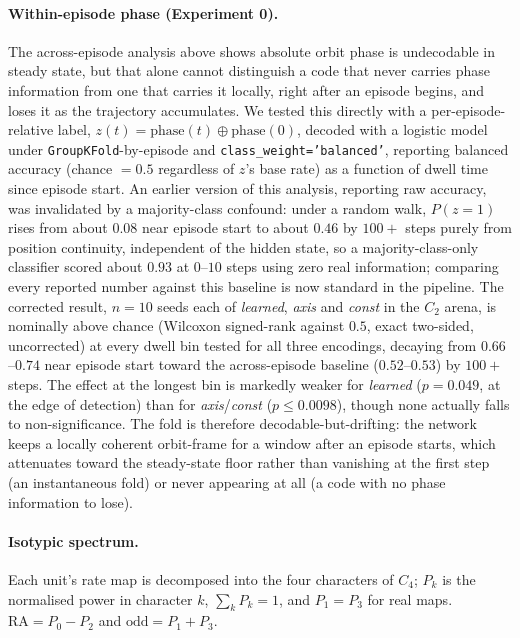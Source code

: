 \documentclass[9pt,lineno]{elife}
\begin{document}
\paragraph{Within-episode phase (Experiment 0).} The across-episode analysis above shows absolute
orbit phase is undecodable in steady state, but that alone cannot distinguish a code that never
carries phase information from one that carries it locally, right after an episode begins, and
loses it as the trajectory accumulates. We tested this directly with a per-episode-relative label,
$z(t) = \text{phase}(t) \oplus \text{phase}(0)$, decoded with a logistic model under
\texttt{GroupKFold}-by-episode and \texttt{class\_weight='balanced'}, reporting balanced accuracy
(chance $=0.5$ regardless of $z$'s base rate) as a function of dwell time since episode start. An
earlier version of this analysis, reporting raw accuracy, was invalidated by a majority-class
confound: under a random walk, $P(z=1)$ rises from about $0.08$ near episode start to about $0.46$
by $100+$ steps purely from position continuity, independent of the hidden state, so a
majority-class-only classifier scored about $0.93$ at $0$--$10$ steps using zero real information;
comparing every reported number against this baseline is now standard in the pipeline.
The corrected result, $n=10$ seeds each of \textit{learned}, \textit{axis} and \textit{const} in
the $C_2$ arena, is nominally above chance (Wilcoxon signed-rank against $0.5$, exact two-sided,
uncorrected) at every dwell bin tested for all three encodings, decaying from
$0.66$--$0.74$ near episode start toward the across-episode baseline ($0.52$--$0.53$) by
$100+$ steps. The effect at the longest bin is markedly weaker for \textit{learned}
($p=0.049$, at the edge of detection) than for \textit{axis}/\textit{const} ($p \le 0.0098$),
though none actually falls to non-significance. The fold is therefore decodable-but-drifting: the
network keeps a locally coherent orbit-frame for a window after an episode starts, which
attenuates toward the steady-state floor rather than vanishing at the first step (an instantaneous
fold) or never appearing at all (a code with no phase information to lose).

\paragraph{Isotypic spectrum.} Each unit's rate map is decomposed into the four characters of
$C_4$; $P_k$ is the normalised power in character $k$, $\sum_k P_k = 1$, and $P_1 = P_3$ for real
maps. $\mathrm{RA} = P_0 - P_2$ and $\mathrm{odd} = P_1 + P_3$.
\end{document}
